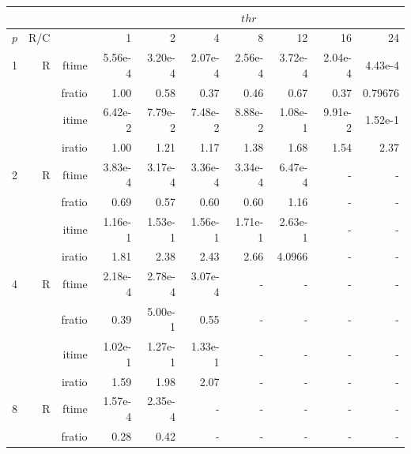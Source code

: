\documentclass[a4paper]{article}
\begin{document}
\begin{table}[htbp]
\begin{center}
\begin{small}
\begin{tabular}{|r|r|r|r|r|r|r|r|r|r|}
\hline 
     & & & \multicolumn{7}{c|}{$thr$} \\ \hline
    $p$ & R/C &  & 1           & 2    & 4    & 8    & 12   & 16    & 24  \\ \hline\hline
   1 &  R &   ftime &    5.56e-4 &    3.20e-4 &    2.07e-4 &    2.56e-4 &    3.72e-4 &    2.04e-4 &    4.43e-4 \\
             &             &  fratio &    1.00 &    0.58 &    0.37 &    0.46 &    0.67 &    0.37 &    0.79676 \\
             &             &  itime &    6.42e-2 &    7.79e-2 &    7.48e-2 &    8.88e-2 &    1.08e-1 &    9.91e-2 &    1.52e-1 \\
             &             &  iratio &    1.00 &    1.21  &   1.17  &    1.38  &    1.68  &    1.54  &   2.37  \\\hline
   2 &  R &   ftime &    3.83e-4 &    3.17e-4 &    3.36e-4 &    3.34e-4 &    6.47e-4 &      - &      - \\
             &             &  fratio &   0.69 &    0.57 &    0.60 &    0.60 &    1.16  &      - &      - \\
             &             &  itime &    1.16e-1 &    1.53e-1 &    1.56e-1 &    1.71e-1 &    2.63e-1 &      - &      - \\
             &             &  iratio &    1.81  &    2.38  &    2.43  &    2.66  &    4.0966  &      - &      - \\\hline
   4 &  R &   ftime &    2.18e-4 &    2.78e-4 &    3.07e-4 &      - &      - &      - &      - \\
             &             &  fratio &    0.39 &    5.00e-1 &    0.55 &      - &      - &      - &      - \\
             &             &  itime &    1.02e-1 &    1.27e-1 &    1.33e-1 &      - &      - &      - &      - \\
             &             &  iratio &    1.59  &    1.98  &    2.07  &      - &      - &      - &      - \\\hline
   8 &   R &   ftime &    1.57e-4 &    2.35e-4 &      - &      - &      - &      - &      - \\
             &             &  fratio &    0.28 &    0.42 &      - &      - &      - &      - &      - \\

\end{tabular}
\end{small}
\end{center}
\end{table}
\end{document}
